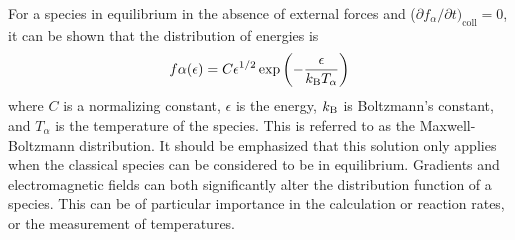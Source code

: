 For a species in equilibrium in the absence of external forces and ($\partial
f_\alpha/\partial t)_\mathrm{coll} = 0$, it can be shown \cite{Druyvesteyn1940}
that the distribution of energies is
\begin{equation}\label{eq:mb}
  f\alpha(\epsilon) = C \epsilon^{1/2}
          \exp\left( -\frac{\epsilon}{k_\mathrm{B} T_\alpha}\right)
\end{equation}
where $C$ is a normalizing constant, $\epsilon$ is the energy, $k_\mathrm{B}$ is
Boltzmann's constant, and $T_\alpha$ is the temperature of the species. This is
referred to as the Maxwell-Boltzmann distribution. It should be emphasized that
this solution only applies when the classical species can be considered to be in
equilibrium. Gradients and electromagnetic fields can both significantly alter
the distribution function of a species. This can be of particular importance in
the calculation or reaction rates, or the measurement of temperatures.

